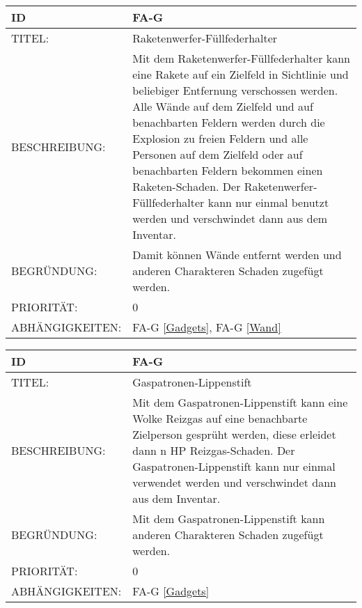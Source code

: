\begin{tabularx}{16cm}{l|X}
	{table}\label{Raketenwerfer-Fuellfederhalter}
	\textbf{ID} & \textbf{FA-G \arabic{table}} \\
	\hline
	TITEL: & Raketenwerfer-Füllfederhalter \\
	\hline
	BESCHREIBUNG: & Mit dem Raketenwerfer-Füllfederhalter kann eine Rakete auf ein Zielfeld in Sichtlinie und beliebiger Entfernung verschossen werden. Alle Wände auf dem Zielfeld und auf benachbarten Feldern werden durch die Explosion zu freien Feldern und alle Personen auf dem Zielfeld oder auf benachbarten Feldern bekommen einen Raketen-Schaden. Der Raketenwerfer-Füllfederhalter kann nur einmal benutzt werden und verschwindet dann aus dem Inventar. \\
	\hline
	BEGRÜNDUNG: &  Damit können Wände entfernt werden und anderen Charakteren Schaden zugefügt werden. \\
	\hline
	PRIORITÄT: & 0\\
	\hline
	ABHÄNGIGKEITEN: & FA-G \ref{Gadgets}, FA-G \ref{Wand} \\
\end{tabularx}

\begin{tabularx}{16cm}{l|X}
	{table}\label{Gaspatronen-Lippenstift}
	\textbf{ID} & \textbf{FA-G \arabic{table}} \\
	\hline
	TITEL: & Gaspatronen-Lippenstift \\
	\hline
	BESCHREIBUNG: & Mit dem Gaspatronen-Lippenstift kann eine Wolke Reizgas auf eine benachbarte Zielperson gesprüht werden, diese erleidet dann n HP Reizgas-Schaden. Der Gaspatronen-Lippenstift kann nur einmal verwendet werden und verschwindet dann aus dem Inventar. \\
	\hline
	BEGRÜNDUNG: &  Mit dem Gaspatronen-Lippenstift kann anderen Charakteren Schaden zugefügt werden. \\
	\hline
	PRIORITÄT: & 0\\
	\hline
	ABHÄNGIGKEITEN: & FA-G \ref{Gadgets} \\
\end{tabularx}

